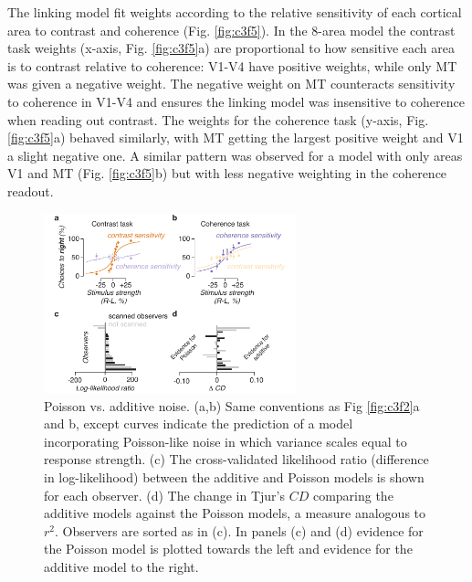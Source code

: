 The linking model fit weights according to the relative sensitivity of each cortical area to contrast and coherence (Fig. \ref{fig:c3f5}). In the 8-area model the contrast task weights (x-axis, Fig. \ref{fig:c3f5}a) are proportional to how sensitive each area is to contrast relative to coherence: V1-V4 have positive weights, while only MT was given a negative weight. The negative weight on MT counteracts sensitivity to coherence in V1-V4 and ensures the linking model was insensitive to coherence when reading out contrast. The weights for the coherence task (y-axis, Fig. \ref{fig:c3f5}a) behaved similarly, with MT getting the largest positive weight and V1 a slight negative one. A similar pattern was observed for a model with only areas V1 and MT (Fig. \ref{fig:c3f5}b) but with less negative weighting in the coherence readout.  

\begin{figure}
\centering
\includegraphics[keepaspectratio,width=0.65\textwidth]{figs_c3/Fig6_poisson.pdf}
\caption[Poisson vs. additive noise]{Poisson vs. additive noise. (a,b) Same conventions as Fig \ref{fig:c3f2}a and b, except curves indicate the prediction of a model incorporating Poisson-like noise in which variance scales equal to response strength. (c) The cross-validated likelihood ratio (difference in log-likelihood) between the additive and Poisson models is shown for each observer. (d) The change in Tjur’s $CD$ comparing the additive models against the Poisson models, a measure analogous to $r^2$. Observers are sorted as in (c). In panels (c) and (d) evidence for the Poisson model is plotted towards the left and evidence for the additive model to the right.}
\label{fig:c3f6}
\end{figure}

